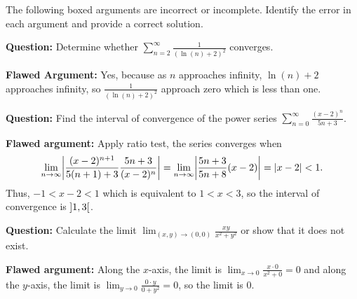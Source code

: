 \documentclass{discussion}
\begin{document}
\clearpage


\begin{question}
    The following boxed arguments are incorrect or incomplete.
    Identify the error in each argument and provide a correct solution.

    \begin{mdframed}
        \textbf{Question:} Determine whether \(\sum_{n=2}^{\infty} \frac{1}{(\ln(n) + 2)^2}\) converges.

        \vspace{10pt}
        \noindent
        \textbf{Flawed Argument:} Yes, because as \(n\) approaches infinity, \(\ln(n) + 2\) approaches infinity, so \(\frac{1}{(\ln(n) + 2)^2}\) approach zero which is less than one.
    \end{mdframed}

    \vspace{10pt}

    \begin{mdframed}
        \textbf{Question:} Find the interval of convergence of the power series \(\sum_{n=0}^{\infty} \frac{(x-2)^n}{5n + 3}\).

        \vspace{10pt}
        \noindent
        \textbf{Flawed argument:} Apply ratio test, the series converges when
        \begin{equation*}
            \lim_{n\to \infty} \abs*{\frac{(x-2)^{n+1}}{5(n+1) + 3} \frac{5n + 3}{(x-2)^n}} = \lim_{n\to \infty} \abs*{\frac{5n + 3}{5n + 8} (x - 2)} = \abs{x-2} < 1.
        \end{equation*}
        Thus, \(-1 < x - 2 < 1\) which is equivalent to \(1 < x < 3\), so the interval of convergence is \(\ointerval{1}{3}\).
    \end{mdframed}

    \vspace{10pt}

    \begin{mdframed}
        \textbf{Question:} Calculate the limit \(\lim_{(x, y) \to (0,0)} \frac{xy}{x^2 + y^2}\) or show that it does not exist.

        \vspace{10pt}
        \noindent
        \textbf{Flawed argument:} Along the \(x\)-axis, the limit is \(\lim_{x \to 0} \frac{x \cdot 0}{x^2 + 0} = 0\) and along the \(y\)-axis, the limit is \(\lim_{y \to 0} \frac{0 \cdot y}{0 + y^2} = 0\), so the limit is \(0\).
    \end{mdframed}


\end{question}
\end{document}
